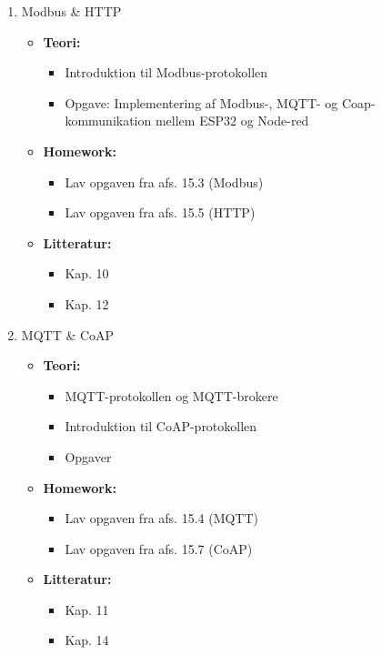 \documentclass[12pt,a4paper]{article}
\begin{document}
\begin{enumerate}[leftmargin=*, label=\textbf{Dag \arabic* (3 timer)}]
	\item Modbus \& HTTP
	\begin{itemize}
		\item \textbf{Teori:}
		\begin{itemize}
			\item Introduktion til Modbus-protokollen
			\item Opgave: Implementering af Modbus-, MQTT- og Coap-kommunikation mellem ESP32 og Node-red
		\end{itemize}
		\item  \textbf{Homework:}
		\begin{itemize}
			\item Lav opgaven fra afs. 15.3 (Modbus)
			\item Lav opgaven fra afs. 15.5 (HTTP)
		\end{itemize}
		\item \textbf{Litteratur:}
		\begin{itemize}
			\item Kap. 10
			\item Kap. 12
		\end{itemize}
	\end{itemize}

	\item MQTT \& CoAP
	\begin{itemize}
		\item \textbf{Teori:}
		\begin{itemize}
		    \item MQTT-protokollen og MQTT-brokere
			\item Introduktion til CoAP-protokollen
			\item Opgaver
		\end{itemize}
		\item  \textbf{Homework:}
		\begin{itemize}
			\item Lav opgaven fra afs. 15.4 (MQTT)
			\item Lav opgaven fra afs. 15.7 (CoAP)
		\end{itemize}
		\item \textbf{Litteratur:}
		\begin{itemize}
			\item Kap. 11
			\item Kap. 14
		\end{itemize}
	\end{itemize}
	

\end{enumerate}
\end{document}
